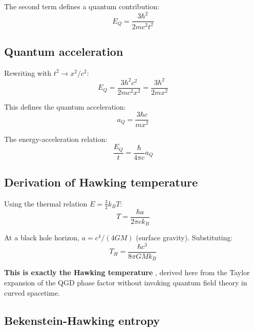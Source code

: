 \documentclass[11pt,a4paper]{article}
\theoremstyle{definition}
\theoremstyle{remark}
\begin{document}
	The second term defines a quantum contribution:
	\begin{equation}
		E_Q = \frac{3\hbar^2}{2mc^2 t^2}
		\label{eq:E_quantum}
	\end{equation}
	
	\subsection{Quantum acceleration}
	
	Rewriting with $t^2 \to x^2/c^2$:
	\begin{equation}
		E_Q = \frac{3\hbar^2 c^2}{2mc^2 x^2} = \frac{3\hbar^2}{2mx^2}
		\label{eq:E_quantum_spatial}
	\end{equation}
	
	This defines the quantum acceleration:
	\begin{equation}
		a_Q = \frac{3\hbar c}{mx^2}
		\label{eq:a_quantum}
	\end{equation}
	
	The energy-acceleration relation:
	\begin{equation}
		\frac{E_Q}{t} = \frac{\hbar}{4\pi c} a_Q
		\label{eq:energy_accel}
	\end{equation}
	
	\subsection{Derivation of Hawking temperature}
	
	Using the thermal relation $E = \frac{3}{2}k_B T$:
	\begin{equation}
		T = \frac{\hbar a}{2\pi c k_B}
		\label{eq:unruh_temperature}
	\end{equation}
	
	At a black hole horizon, $a = c^4/(4GM)$ (surface gravity). Substituting:
	\begin{equation}
		\boxed{T_H = \frac{\hbar c^3}{8\pi G M k_B}}
		\label{eq:hawking_temperature}
	\end{equation}
	
	\textbf{This is exactly the Hawking temperature} \cite{Hawking1974}, derived here from the Taylor expansion of the QGD phase factor without invoking quantum field theory in curved spacetime.
	
	\subsection{Bekenstein-Hawking entropy}
	
\end{document}
